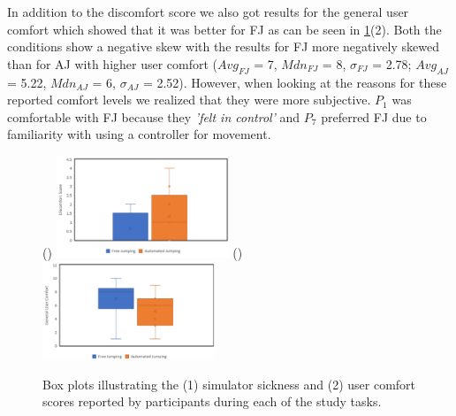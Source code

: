 In addition to the discomfort score we also got results for the general user comfort which showed that it was better for FJ as can be seen in \ref{fig:user-comfort}(2). Both the conditions show a negative skew with the results for FJ more negatively skewed than for AJ with higher user comfort ($Avg_{FJ}$ = 7, $Mdn_{FJ}$ = 8, $\sigma_{FJ}$ = 2.78; $Avg_{AJ}$ = 5.22, $Mdn_{AJ}$ = 6, $\sigma_{AJ}$ = 2.52). However, when looking at the reasons for these reported comfort levels we realized that they were more subjective. $P_1$ was comfortable with FJ because they \textit{'felt in control'} and $P_7$ preferred FJ due to familiarity with using a controller for movement. 
\begin{figure}[]
	()
	\includegraphics[width=0.46\textwidth]{images/simulator-sickness.pdf}
	()
	\includegraphics[width=0.46\textwidth]{images/user-comfort.pdf}
	\caption{Box plots illustrating the (1) simulator sickness and (2) user comfort scores reported by participants during each of the study tasks.}
	\label{fig:user-comfort}
\end{figure}

